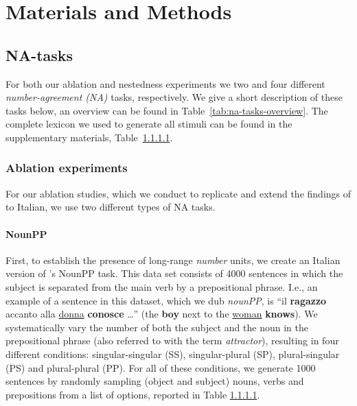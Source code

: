 \section{Materials and Methods}

\subsection{NA-tasks}

For both our ablation and nestedness experiments  we two and four different \emph{number-agreement (NA)} tasks, respectively.
We give a short description of these tasks below, an overview can be found in Table~\ref{tab:na-tasks-overview}.
The complete lexicon we used to generate all stimuli can be found in the supplementary materials, Table~\ref{}.

\subsubsection{Ablation experiments}
For our ablation studies, which we conduct to replicate and extend the findings of \citet{lakretz2019emergence} to Italian, we use two different types of NA tasks.

\paragraph{NounPP}
First, to establish the presence of long-range \emph{number} units, we create an Italian version of \citeauthor{lakretz2019emergence}'s \citeyear{lakretz2019emergence} NounPP task.
This data set consists of 4000 sentences in which the subject is separated from the main verb by a prepositional phrase.
I.e., an example of a sentence in this dataset, which we dub \emph{nounPP}, is ``il \textbf{ragazzo} accanto alla \underline{donna} \textbf{conosce} \ldots'' (the \textbf{boy} next to the \underline{woman} \textbf{knows}).
We systematically vary the number of both the subject and the noun in the prepositional phrase (also referred to with the term \emph{attractor}), resulting in four different conditions: singular-singular (SS), singular-plural (SP), plural-singular (PS) and plural-plural (PP).
For all of these conditions, we generate 1000 sentences by randomly sampling (object and subject) nouns, verbs and prepositions from a list of options, reported in Table \ref{}.

